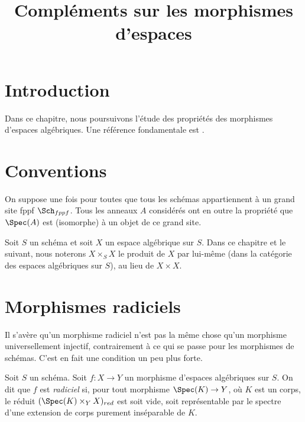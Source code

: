 

%


\title{Compléments sur les morphismes d'espaces}


\maketitle

\label{section-phantom}

\tableofcontents

\section{Introduction}
\label{section-introduction}

\noindent
Dans ce chapitre, nous poursuivons l'étude des propriétés des morphismes
d'espaces algébriques. Une référence fondamentale est \cite{Kn}.





\section{Conventions}
\label{section-conventions}

\noindent
On suppose une fois pour toutes que tous les schémas appartiennent à
un grand site fppf $\Sch_{fppf}$. Tous les anneaux $A$ considérés
ont en outre la propriété que $\Spec(A)$ est (isomorphe) à un
objet de ce grand site.

\medskip\noindent
Soit $S$ un schéma et soit $X$ un espace algébrique sur $S$.
Dans ce chapitre et le suivant, nous noterons $X \times_S X$
le produit de $X$ par lui-même (dans la catégorie des espaces
algébriques sur $S$), au lieu de $X \times X$.








\section{Morphismes radiciels}
\label{section-radicial}

\noindent
Il s'avère qu'un morphisme radiciel n'est pas la même chose qu'un
morphisme universellement injectif, contrairement à ce qui se passe pour les
morphismes de schémas. C'est en fait une condition un peu plus forte.

\begin{definition}
\label{definition-radicial}
Soit $S$ un schéma. Soit $f : X \to Y$ un morphisme d'espaces algébriques
sur $S$. On dit que $f$ est {\it radiciel} si, pour tout morphisme
$\Spec(K) \to Y$, où $K$ est un corps, le réduit
$(\Spec(K) \times_Y X)_{red}$ est soit vide, soit
représentable par le spectre d'une extension de corps purement inséparable de $K$.
\end{definition}

